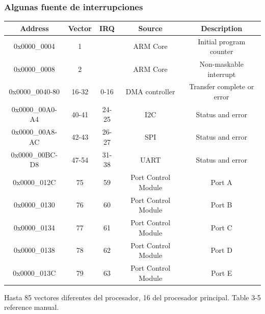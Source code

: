 \documentclass[10.5pt,scale=1.0,t,aspectratio=169,hyperref={pdfpagelabels=false}]{beamer}
\begin{document}
\begin{frame}
	\frametitle{Algunas fuente de interrupciones}
	\begin{table}
		\centering
		\begin{tabular}{ccccc}
			\hline
			\textbf{Address} & \textbf{Vector} & \textbf{IRQ} & \textbf{Source} & \textbf{Description} \\
			\hline
			0x0000\_0004 & 1 & & ARM Core & Initial program counter \\
			0x0000\_0008 & 2 & & ARM Core & Non-maskable interrupt \\
			0x0000\_0040-80 & 16-32 & 0-16 & DMA controller & Transfer complete or error \\
			0x0000\_00A0-A4 & 40-41 & 24-25 & I2C & Status and error \\
			0x0000\_00A8-AC & 42-43 & 26-27 & SPI & Status and error \\
			0x0000\_00BC-D8 & 47-54 & 31-38 & UART & Status and error \\
			0x0000\_012C & 75 & 59 & Port Control Module & Port A \\
			0x0000\_0130 & 76 & 60 & Port Control Module & Port B \\
			0x0000\_0134 & 77 & 61 & Port Control Module & Port C \\
			0x0000\_0138 & 78 & 62 & Port Control Module & Port D \\
			0x0000\_013C & 79 & 63 & Port Control Module & Port E \\
			\hline
		\end{tabular}
	\end{table}
	Hasta 85 vectores diferentes del procesador, 16 del procesador principal. Table 3-5 reference manual. 
\end{frame}
\end{document}
